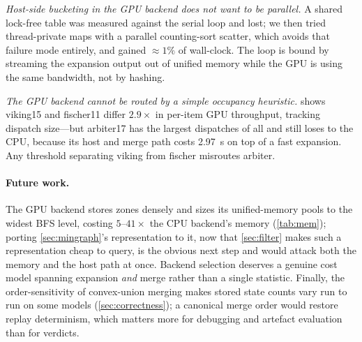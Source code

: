\emph{Host-side bucketing in the GPU backend does not want to be parallel.}  A
shared lock-free table was measured against the serial loop and lost; we then
tried thread-private maps with a parallel counting-sort scatter, which avoids
that failure mode entirely, and gained ${\approx}1\%$ of wall-clock.  The loop is
bound by streaming the expansion output out of unified memory while the GPU is
using the same bandwidth, not by hashing.

\emph{The GPU backend cannot be routed by a simple occupancy heuristic.}
 shows viking15 and fischer11 differ $2.9\times$ in per-item GPU
throughput, tracking dispatch size---but arbiter17 has the largest dispatches of
all and still loses to the CPU, because its host and merge path costs
\SI{2.97}{\second} on top of a fast expansion.  Any threshold separating viking
from fischer misroutes arbiter.

\paragraph{Future work.}
The GPU backend stores zones densely and sizes its unified-memory pools to the
widest BFS level, costing $5$--$41\times$ the CPU backend's memory
(\cref{tab:mem}); porting \cref{sec:mingraph}'s representation to it, now that
\cref{sec:filter} makes such a representation cheap to query, is the obvious next
step and would attack both the memory and the host path at once.  Backend
selection deserves a genuine cost model spanning expansion \emph{and} merge
rather than a single statistic.  Finally, the order-sensitivity of convex-union
merging makes stored state counts vary run to run on some models
(\cref{sec:correctness}); a canonical merge order would restore replay
determinism, which matters more for debugging and artefact evaluation than for
verdicts.
